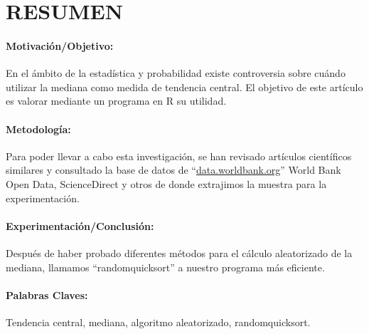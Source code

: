 \documentclass[a4 paper,12pt]{article}
\begin{document}
	\section*{RESUMEN}
	\paragraph{Motivación/Objetivo:}
	En el ámbito de la estadística y probabilidad existe controversia sobre cuándo utilizar la mediana como medida de tendencia central. El objetivo de este artículo es valorar mediante un programa en R su utilidad.
	\paragraph{Metodología:}
	Para poder llevar a cabo esta investigación, se han revisado artículos científicos similares y consultado la base de datos de “\url{data.worldbank.org}” World Bank Open Data, ScienceDirect y otros de donde extrajimos la muestra para la experimentación.
	\paragraph{Experimentación/Conclusión:}
	Después de haber probado diferentes métodos para el cálculo aleatorizado de la mediana, llamamos “randomquicksort” a nuestro programa más eficiente.
	\paragraph{Palabras Claves:}
	Tendencia central, mediana, algoritmo aleatorizado, randomquicksort.
\end{document}
